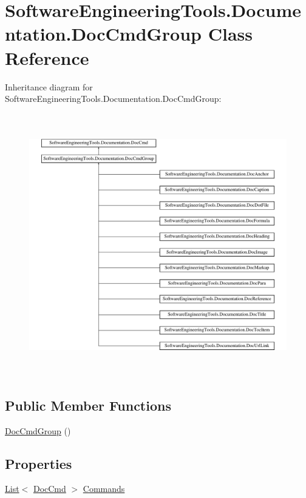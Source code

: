 \hypertarget{class_software_engineering_tools_1_1_documentation_1_1_doc_cmd_group}{\section{Software\+Engineering\+Tools.\+Documentation.\+Doc\+Cmd\+Group Class Reference}
\label{class_software_engineering_tools_1_1_documentation_1_1_doc_cmd_group}
}
Inheritance diagram for Software\+Engineering\+Tools.\+Documentation.\+Doc\+Cmd\+Group\+:\begin{figure}[H]
\begin{center}
\leavevmode
\includegraphics[height=11.461988cm]{class_software_engineering_tools_1_1_documentation_1_1_doc_cmd_group}
\end{center}
\end{figure}
\subsection*{Public Member Functions}
\begin{DoxyCompactItemize}
\item 
\hyperlink{class_software_engineering_tools_1_1_documentation_1_1_doc_cmd_group_adc2876c88d61e89b18cf833132a0def5}{Doc\+Cmd\+Group} ()
\end{DoxyCompactItemize}
\subsection*{Properties}
\begin{DoxyCompactItemize}
\item 
\hyperlink{namespace_software_engineering_tools_1_1_documentation_ae0bccf4f49a76db084c1c316e5954ec9a4ee29ca12c7d126654bd0e5275de6135}{List}$<$ \hyperlink{class_software_engineering_tools_1_1_documentation_1_1_doc_cmd}{Doc\+Cmd} $>$ \hyperlink{class_software_engineering_tools_1_1_documentation_1_1_doc_cmd_group_ac6f2fb2ec29fc2eeac0f46740b2c5144}{Commands}
\end{DoxyCompactItemize}


